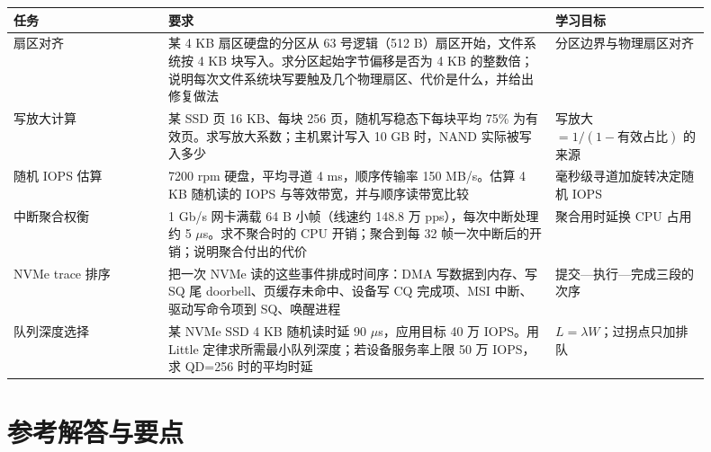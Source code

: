 \begin{longtable}{L{0.2\linewidth}L{0.5\linewidth}L{0.2\linewidth}}
\toprule
任务 & 要求 & 学习目标 \\
\midrule
扇区对齐 & 某 4 KB 扇区硬盘的分区从 63 号逻辑（512 B）扇区开始，文件系统按 4 KB 块写入。求分区起始字节偏移是否为 4 KB 的整数倍；说明每次文件系统块写要触及几个物理扇区、代价是什么，并给出修复做法 & 分区边界与物理扇区对齐 \\
写放大计算 & 某 SSD 页 16 KB、每块 256 页，随机写稳态下每块平均 75\% 为有效页。求写放大系数；主机累计写入 10 GB 时，NAND 实际被写入多少 & 写放大 $=1/(1-\text{有效占比})$ 的来源 \\
随机 IOPS 估算 & 7200 rpm 硬盘，平均寻道 4 ms，顺序传输率 150 MB/s。估算 4 KB 随机读的 IOPS 与等效带宽，并与顺序读带宽比较 & 毫秒级寻道加旋转决定随机 IOPS \\
中断聚合权衡 & 1 Gb/s 网卡满载 64 B 小帧（线速约 148.8 万 pps），每次中断处理约 5 $\mu$s。求不聚合时的 CPU 开销；聚合到每 32 帧一次中断后的开销；说明聚合付出的代价 & 聚合用时延换 CPU 占用 \\
NVMe trace 排序 & 把一次 NVMe 读的这些事件排成时间序：DMA 写数据到内存、写 SQ 尾 doorbell、页缓存未命中、设备写 CQ 完成项、MSI 中断、驱动写命令项到 SQ、唤醒进程 & 提交—执行—完成三段的次序 \\
队列深度选择 & 某 NVMe SSD 4 KB 随机读时延 90 $\mu$s，应用目标 40 万 IOPS。用 Little 定律求所需最小队列深度；若设备服务率上限 50 万 IOPS，求 QD=256 时的平均时延 & $L=\lambda W$；过拐点只加排队 \\
\bottomrule
\end{longtable}

\section*{参考解答与要点}

